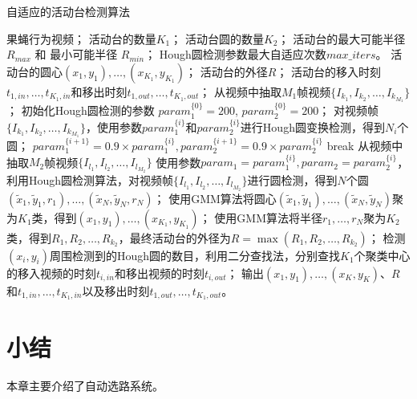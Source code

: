 \begin{algorithm}
    \caption{自适应的活动台检测算法}
    \label{alg:container_split_adaptive}
\begin{algorithmic}[1]
\INPUT
    \Statex 果蝇行为视频；
    \Statex 活动台的数量$K_1$；
    \Statex 活动台圆的数量$K_2$；
    \Statex 活动台的最大可能半径$R_{max}$ 和 最小可能半径 $R_{min}$；
    \Statex Hough圆检测参数最大自适应次数$max\_iters$。
\OUTPUT
    \Statex 活动台的圆心$(x_1, y_1), \ldots, (x_{K_1},y_{K_1})$；
    \Statex 活动台的外径$R$；
    \Statex 活动台的移入时刻$t_{1, in}, \ldots, t_{K_1, in}$和移出时刻$t_{1, out}, \ldots, t_{K_1, out}$；
\State 从视频中抽取$M_1$帧视频$\{ I_{k_1}, I_{k_2}, \ldots, I_{k_{M_1}} \}$；
\State 初始化Hough圆检测的参数 $param_1^{\{0\}} = 200$, $param_2^{\{0\}} = 200$；
    \State 对视频帧$\{ I_{k_1}, I_{k_2}, \ldots, I_{k_{M_1}} \}$，使用参数$param^{\{i\}}_1$和$param^{\{i\}}_2$进行Hough圆变换检测，得到$N_i$个圆；
        \State $param_1^{\{i+1\}} = 0.9\times param_1^{\{i\}}, param_2^{\{i+1\}} = 0.9\times param_2^{\{i\}}$
    \Else
        \State break
    \EndIf
\EndFor
\State 从视频中抽取$M_2$帧视频$\{ I_{l_1}, I_{l_2}, \ldots, I_{l_{M_2}} \}$
\State 使用参数$param_1 = param_1^{\{i\}}, param_2 = param_2^{\{i\}}$，利用Hough圆检测算法，对视频帧$\{ I_{l_1}, I_{l_2}, \ldots, I_{l_{M_2}} \}$进行圆检测，得到$N$个圆 $(\tilde{x}_1, \tilde{y}_1, r_1), \ldots, (\tilde{x}_N, \tilde{y}_N, r_N)$；
\State 使用GMM算法\cite{GMM_1999}将圆心$(\tilde{x}_1, \tilde{y}_1), \ldots, (\tilde{x}_N, \tilde{y}_N)$聚为$K_1$类，得到$(x_1, y_1), \ldots, (x_{K_1},y_{K_1})$；\label{alg:arena:clusterXY}
\State 使用GMM算法将半径$r_1, \ldots, r_N$聚为$K_2$类，得到$R_1, R_2, \ldots, R_{k_2}$，最终活动台的外径为$R = \max(R_1, R_2, \ldots, R_{k_2})$；\label{alg:arena:clusterR}
\State 检测$(x_i, y_i)$周围检测到的Hough圆的数目，利用二分查找法，分别查找$K_1$个聚类中心的移入视频的时刻$t_{i,in}$和移出视频的时刻$t_{i, out}$；
\State 输出$(x_1, y_1),\ldots,(x_K, y_K)$、$R$和$t_{1, in}, \ldots, t_{K_1, in}$以及移出时刻$t_{1, out}, \ldots, t_{K_1, out}$。
\end{algorithmic}
\end{algorithm}

\section{小结}

本章主要介绍了自动选路系统。
